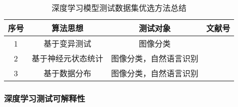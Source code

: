 \begin{table}[t]
	\small
	\centering
	\caption{深度学习模型测试数据集优选方法总结}
	\label{tab:testingDataPri}
	\begin{tabular}{cccc}
		\toprule
		\textbf{序号} & \textbf{算法思想} & \textbf{测试对象} & \textbf{文献号} \\
		\midrule
		1 & 基于变异测试 & 图像分类 & \cite{Wang2021Prioritizing,Ma2018DeepMutation} \\
		2 & 基于神经元状态统计 & 图像分类，自然语言识别 & \cite{Liu2022DeepState,Byun2019Input,Gao2022Adaptive} \\
		3 & 基于数据分布 & 图像分类，自然语言识别 & \cite{Shen2020MultipleBoundary,Feng2020DeepGini,Hu2022AnEmpirical} \\
		\bottomrule
	\end{tabular}
\end{table}






\subsubsection{深度学习测试可解释性}

\iffalse
Zhang等人~\citess{zhang2021duo}提出了一种结合模糊测试和差分生成输入的深度学习框架测试方法Duo，用于解释和评估TensorFlow、PyTorch、MNN、MXNet等深度学习框架；也提出了一种基于模糊测试的算子级精度测试方法Predoo~\citess{zhang2021predoo}，用于估计TensorFlow中单个深度学习算子的精度误差。
Hu等人~\citess{Hu2019DeepMutationPlusPlus}提出了一种基于变异测试的DNN工具DeepMutation++，用于对包括前馈神经网络(FNN)和有状态循环神经网络(RNN)在内的DNN的质量评估，不仅可以静态分析DNN模型对整个输入的鲁棒性，还可以通过运行时分析识别顺序输入的易受攻击部分。
Xie等人~\citess{Xie2019DiffChaser}提出了一种自动黑盒测试框架DiffChaser，用于检测深度学习模型在量化、压缩前后的非目标或目标不一致性。
Du等人~\citess{Du2020Marble}提出了的方法Marble构建了一个概率模型，通过抽象来紧凑表征RNN的鲁棒性，用于对基于RNN的深度学习系统进行定量的鲁棒性分析。

Luo等人~\citess{luo2021graph}将算子级别的覆盖指标引入图论，提出了一种基于图的模糊测试方法来捕捉深度学习框架异常、提高深度学习框架质量和可解释性的方法。
Du等人~\citess{Du2019DeepStellar}~\citess{Du2019AQuantitative}提出了一个基于对抗性样本检测和覆盖引导测试生成的深度学习模型测试方法DeepStellar，基于两个轨迹相似性指标和五个覆盖充分性指标对循环神经网络（RNN）进行定量分析和可解释性研究。
Lee等人~\citess{Lee2020Effective}提出了一种对神经网络进行白盒测试的新方法Adapt，通过使神经元选择策略不断地自适应正在进行的测试状态，增强了深度神经网络的可解释性，在覆盖率和对抗性输入方面有有效表现。
Wang等人~\citess{wang2020deepsonar}提出一种识别AI合成假声音的方法DeepSonar，利用对分层神经元激活模式学习来增强深度神经网络在语音识别方面的可解释性，推测真实和AI合成的假声音之间的细微差异，同时也对操纵攻击（例如语音转换和附加现实世界噪声）的情况具有鲁棒性。
\fi



